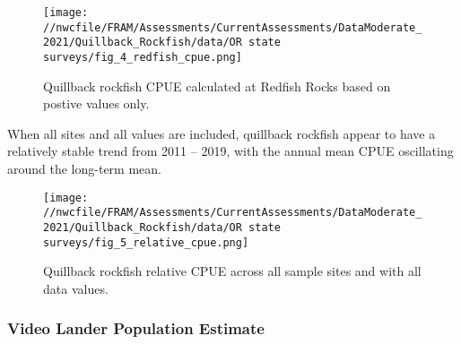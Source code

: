 \documentclass[11pt,
  english,
  a4paper,
]{article}
\begin{document}
\leavevmode\tagmcend\tagstructend\par


\begin{figure}
\centering
\texttt{[image: //nwcfile/FRAM/Assessments/CurrentAssessments/DataModerate\_2021/Quillback\_Rockfish/data/OR state surveys/fig\_4\_redfish\_cpue.png]}
\caption{Quillback rockfish CPUE calculated at Redfish Rocks based on postive values only.\label{fig:fig-4}}
\end{figure}

\tagmcend\tagstructend


When all sites and all values are included, quillback rockfish appear to have a relatively stable trend from 2011 -- 2019, with the annual mean CPUE oscillating around the long-term mean.

\leavevmode\tagmcend\tagstructend\par


\begin{figure}
\centering
\texttt{[image: //nwcfile/FRAM/Assessments/CurrentAssessments/DataModerate\_2021/Quillback\_Rockfish/data/OR state surveys/fig\_5\_relative\_cpue.png]}
\caption{Quillback rockfish relative CPUE across all sample sites and with all data values.\label{fig:fig-5}}
\end{figure}

\tagmcend\tagstructend


\hypertarget{video-lander-population-estimate}{%
\subsubsection{Video Lander Population Estimate}\label{video-lander-population-estimate}}

\leavevmode\tagmcend\tagstructend

\end{document}
